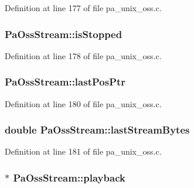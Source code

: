 Definition at line 177 of file pa\+\_\+unix\+\_\+oss.\+c.

\subsubsection[{\texorpdfstring{is\+Stopped}{isStopped}}]{ Pa\+Oss\+Stream\+::is\+Stopped}\hypertarget{struct_pa_oss_stream_a3c19a7322bb3dc1426ee448c821724bc}{}\label{struct_pa_oss_stream_a3c19a7322bb3dc1426ee448c821724bc}


Definition at line 178 of file pa\+\_\+unix\+\_\+oss.\+c.

\subsubsection[{\texorpdfstring{last\+Pos\+Ptr}{lastPosPtr}}]{ Pa\+Oss\+Stream\+::last\+Pos\+Ptr}\hypertarget{struct_pa_oss_stream_ab6ce13dd52a50ff036c85bddb0259859}{}\label{struct_pa_oss_stream_ab6ce13dd52a50ff036c85bddb0259859}


Definition at line 180 of file pa\+\_\+unix\+\_\+oss.\+c.

\subsubsection[{\texorpdfstring{last\+Stream\+Bytes}{lastStreamBytes}}]{\setlength{\rightskip}{0pt plus 5cm}double Pa\+Oss\+Stream\+::last\+Stream\+Bytes}\hypertarget{struct_pa_oss_stream_a90d0de71db73bc00497e7a2fce9c2ce4}{}\label{struct_pa_oss_stream_a90d0de71db73bc00497e7a2fce9c2ce4}


Definition at line 181 of file pa\+\_\+unix\+\_\+oss.\+c.

\subsubsection[{\texorpdfstring{playback}{playback}}]{ $\ast$ Pa\+Oss\+Stream\+::playback}\hypertarget{struct_pa_oss_stream_ad0a29997c2144457023c2557357418fd}{}\label{struct_pa_oss_stream_ad0a29997c2144457023c2557357418fd}


